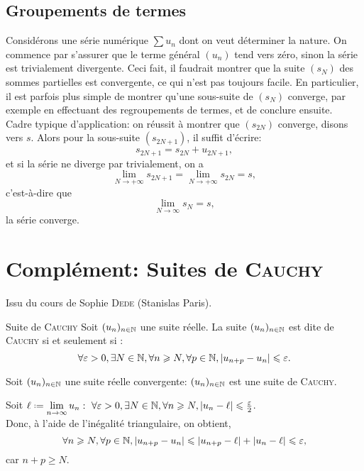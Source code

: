 \subsection{Groupements de termes}

Considérons une série numérique $\sum u_n$ dont on veut déterminer la nature. On commence par s'assurer que le terme général $(u_n)$ tend vers zéro, sinon la série est trivialement divergente. Ceci fait, il faudrait montrer que la suite $(s_N)$ des sommes partielles est convergente, ce qui n'est pas toujours facile. En particulier, il est parfois plus simple de montrer qu'une sous-suite de $(s_N)$ converge, par exemple en effectuant des regroupements de termes, et de conclure ensuite. \\
Cadre typique d'application: on réussit à montrer que $(s_{2N})$ converge, disons vers $s$. Alors pour la sous-suite $(s_{2N+1})$, il suffit d'écrire:
$$s_{2N+1} = s_{2N} + u_{2N+1},$$
et si la série ne diverge par trivialement, on a
$$\lim_{N \to + \infty} s_{2N+1} = \lim_{N \to + \infty} s_{2N} = s,$$
c'est-à-dire que 
$$\lim_{N \to \infty} s_N = s,$$
la série converge. 

\section{Complément: Suites de \textsc{Cauchy}}

Issu du cours de Sophie \textsc{Dede} (Stanislas Paris). \\
\begin{defi}{Suite de \textsc{Cauchy}}
    Soit $(u_n)_{n \in \mathbb{N}}$ une suite réelle. La suite $(u_n)_{n \in \mathbb{N}}$ est dite de \textsc{Cauchy} si et seulement si :
    $$\forall \varepsilon > 0, \exists N \in \mathbb{N}, \forall n \geqslant N, \forall p \in \mathbb{N}, |u_{n+p} - u_n| \leqslant \varepsilon.$$
\end{defi}

\begin{prop}{}
    Soit $(u_n)_{n \in \mathbb{N}}$ une suite réelle convergente: $(u_n)_{n \in \mathbb{N}}$ est une suite de \textsc{Cauchy}.
\end{prop}

\begin{preuve}
    Soit $\ell \defeq \lim\limits_{n \to \infty} u_n:\ \forall \varepsilon > 0, \exists N \in \N, \forall n \geqslant N, |u_n - \ell| \leqslant \frac{\varepsilon}{2}$. \\
    Donc, à l'aide de l'inégalité triangulaire, on obtient,
    $$\forall n \geqslant N, \forall p \in \mathbb{N}, |u_{n+p} - u_n| \leqslant |u_{n+p} - \ell| + |u_n - \ell| \leqslant \varepsilon,$$
    car $n + p \geqslant N$.
\end{preuve}

